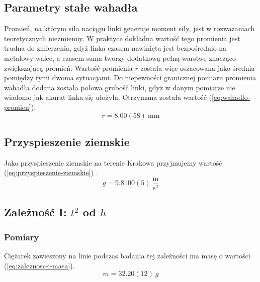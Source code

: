 \documentclass[twocolumn, a4paper, polish, 10pt]{article}
\begin{document}
\subsection{Parametry stałe wahadła}
\label{sec:parametry-stale-wahadla}
Promień, na którym siła naciągu linki generuje moment siły, jest w rozważaniach teoretycznych niezmienny. W praktyce dokładna wartość tego promienia jest trudna do zmierzenia, gdyż linka czasem nawinięta jest bezpośrednio na metalowy walec, a czasem sama tworzy dodatkową pełną warstwę znacząco zwiększającą promień. Wartość promienia $r$ została więc oszacowana jako średnia pomiędzy tymi dwoma sytuacjami. Do niepewności granicznej pomiaru promienia wahadła dodana została połowa grubość linki, gdyż w danym pomiarze nie wiadomo jak akurat linka się ułożyła. Otrzymana została wartość (\ref{eq:wahadlo-promien}).
\begin{equation}
    r = 8.00(58)~\mathrm{mm}
    \label{eq:wahadlo-promien}
\end{equation}

\subsection{Przyspieszenie ziemskie}
Jako przyspieszenie ziemskie na terenie Krakowa przyjmujemy wartość (\ref{eq:przyspieszenie-ziemskie}) \cite{przyspieszenie-ziemskie-krakow}.
\begin{equation}
    g = 9.8100(5)~\mathrm{\frac{m}{s^2}}
    \label{eq:przyspieszenie-ziemskie}
\end{equation}

\subsection{Zależność I: \texorpdfstring{$t^2$}{t²} od \texorpdfstring{$h$}{h}}
\subsubsection{Pomiary}
Ciężarek zawieszony na linie podczas badania tej zależności ma masę o wartości (\ref{eq:zaleznosc-i-masa}).
\begin{equation}
    m = 32.20(12)~g
    \label{eq:zaleznosc-i-masa}
\end{equation}
\end{document}

